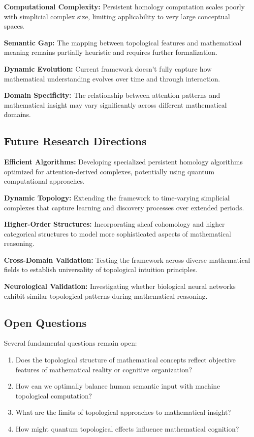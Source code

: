 \documentclass[11pt]{article}
\begin{document}
\textbf{Computational Complexity:} Persistent homology computation scales poorly with simplicial complex size, limiting applicability to very large conceptual spaces.

\textbf{Semantic Gap:} The mapping between topological features and mathematical meaning remains partially heuristic and requires further formalization.

\textbf{Dynamic Evolution:} Current framework doesn't fully capture how mathematical understanding evolves over time and through interaction.

\textbf{Domain Specificity:} The relationship between attention patterns and mathematical insight may vary significantly across different mathematical domains.

\subsection{Future Research Directions}

\textbf{Efficient Algorithms:} Developing specialized persistent homology algorithms optimized for attention-derived complexes, potentially using quantum computational approaches.

\textbf{Dynamic Topology:} Extending the framework to time-varying simplicial complexes that capture learning and discovery processes over extended periods.

\textbf{Higher-Order Structures:} Incorporating sheaf cohomology and higher categorical structures to model more sophisticated aspects of mathematical reasoning.

\textbf{Cross-Domain Validation:} Testing the framework across diverse mathematical fields to establish universality of topological intuition principles.

\textbf{Neurological Validation:} Investigating whether biological neural networks exhibit similar topological patterns during mathematical reasoning.

\subsection{Open Questions}

Several fundamental questions remain open:

\begin{enumerate}
\item Does the topological structure of mathematical concepts reflect objective features of mathematical reality or cognitive organization?
\item How can we optimally balance human semantic input with machine topological computation?
\item What are the limits of topological approaches to mathematical insight?
\item How might quantum topological effects influence mathematical cognition?
\end{enumerate}
\end{document}
